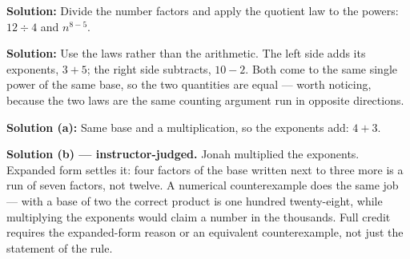 \documentclass[12pt]{article}
\begin{document}

\textbf{Solution:} \quad Divide the number factors and apply the quotient law to the
powers: $12 \div 4$ and $n^{8-5}$. 


\textbf{Solution:} \quad Use the laws rather than the arithmetic. The left side adds its
exponents, $3 + 5$; the right side subtracts, $10 - 2$. Both come to the same single power
of the same base, so the two quantities are equal --- worth noticing, because the two laws
are the same counting argument run in opposite directions. \ans{=}


\textbf{Solution (a):} \quad Same base and a multiplication, so the exponents add:
$4 + 3$. 

\textbf{Solution (b) --- instructor-judged.} \quad Jonah multiplied the exponents. Expanded
form settles it: four factors of the base written next to three more is a run of seven
factors, not twelve. A numerical counterexample does the same job --- with a base of two
the correct product is one hundred twenty-eight, while multiplying the exponents would
claim a number in the thousands. Full credit requires the expanded-form reason or an
equivalent counterexample, not just the statement of the rule.
\end{document}
